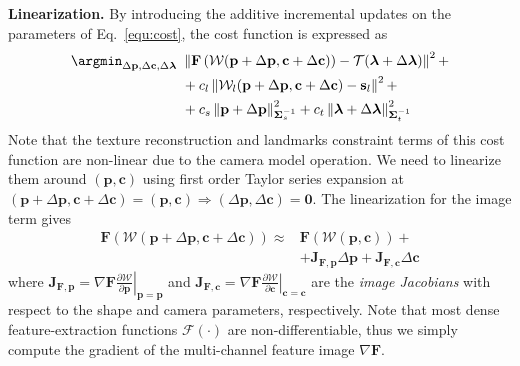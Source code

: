%
\textbf{Linearization.} By introducing the additive incremental updates on the
parameters of Eq.~\ref{equ:cost}, the cost function is expressed as
%
\begin{equation}
\begin{aligned}
\argmin_{\Delta\mathbf{p},\Delta\mathbf{c},\Delta\boldsymbol{\lambda}}~& \left\lVert\mathbf{F}\left(\mathcal{W}(\mathbf{p}+\Delta\mathbf{p},\mathbf{c}+\Delta\mathbf{c})\right) - \mathcal{T}(\boldsymbol{\lambda}+\Delta\boldsymbol{\lambda})\right\rVert^2 + \\
& + c_l\left\lVert\mathcal{W}_l(\mathbf{p}+\Delta\mathbf{p},\mathbf{c}+\Delta\mathbf{c}) - \mathbf{s}_l\right\rVert^2 +\\
& + c_s\left\lVert\mathbf{p}+\Delta\mathbf{p}\right\rVert^2_{\mathbf{\Sigma}_s^{-1}} + c_t\left\lVert\boldsymbol{\lambda}+\Delta\boldsymbol{\lambda}\right\rVert^2_{\mathbf{\Sigma}_t^{-1}}
\end{aligned}
\label{equ:cost_with_deltas}
\end{equation}
%
Note that the texture reconstruction
and landmarks constraint terms of this cost function are non-linear due
to the camera model operation. We need to linearize them around
$(\mathbf{p}, \mathbf{c})$ using first order Taylor series expansion at
$(\mathbf{p}+\Delta\mathbf{p},\mathbf{c}+\Delta\mathbf{c})=(\mathbf{p},\mathbf{c})\Rightarrow(\Delta\mathbf{p},\Delta\mathbf{c})=\mathbf{0}$.
The linearization for the image term gives
%
\begin{equation}
\begin{aligned}
\mathbf{F}\left(\mathcal{W}(\mathbf{p}+\Delta\mathbf{p},\mathbf{c}+\Delta\mathbf{c})\right) \approx & \mathbf{F}\left(\mathcal{W}(\mathbf{p},\mathbf{c})\right) + \\
& + \mathbf{J}_{\mathbf{F},\mathbf{p}}\Delta\mathbf{p} + \mathbf{J}_{\mathbf{F},\mathbf{c}}\Delta\mathbf{c}
\end{aligned}
\label{equ:image_linearization}
\end{equation}
%
where $\mathbf{J}_{\mathbf{F},\mathbf{p}}=\nabla\mathbf{F}\left.\frac{\partial\mathcal{W}}{\partial\mathbf{p}}\right|_{\mathbf{p}=\mathbf{p}}$
and
$\mathbf{J}_{\mathbf{F},\mathbf{c}}=\nabla\mathbf{F}\left.\frac{\partial\mathcal{W}}{\partial\mathbf{c}}\right|_{\mathbf{c}=\mathbf{c}}$
are the \emph{image Jacobians} with respect to the shape and camera parameters, respectively. Note that most dense feature-extraction functions $\mathcal{F}(\cdot)$ are non-differentiable, thus we simply compute the gradient of the multi-channel feature image $\nabla\mathbf{F}$.
